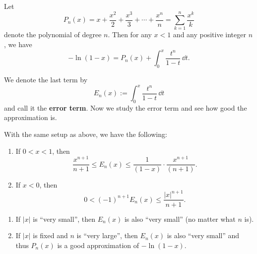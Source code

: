 \documentclass[a4paper]{ctexart}
\begin{document}
	\begin{mythm}
		Let
		\[
		P_n(x) = x + \frac{x^2}{2} + \frac{x^3}{3} + \cdots + \frac{x^n}{n} = \sum_{k=1}^n \frac{x^k}{k}
		\]
		denote the polynomial of degree $n$. Then for any $x<1$ and any positive integer $n$, we have
		\[
		-\ln(1-x) = P_n(x) + \int_0^x \frac{t^n}{1-t}\, \dd t.
		\]
	\end{mythm}
	\begin{myrmk}
		We denote the last term by
		\[
		E_n(x) := \int_0^x \frac{t^n}{1-t}\, \dd t
		\]
		and call it the \textbf{error term}. Now we study the error term and see how good the approximation is.
	\end{myrmk}
	\begin{mythm}
		With the same setup as above, we have the following:
		\begin{enumerate}
			\item [(1)] If $0<x<1$, then
			\[
			\frac{x^{n+1}}{n+1} \leq E_n(x) \leq \frac{1}{(1-x)}\cdot\frac{x^{n+1}}{(n+1)}.
			\]
			\item [(2)] If $x<0$, then
			\[
			0 < (-1)^{n+1} E_n(x) \leq \frac{|x|^{n+1}}{n+1}.
			\]
		\end{enumerate}
	\end{mythm}
	\begin{myrmk}
		\begin{enumerate}
			\item [(1)] If $|x|$ is ``very small'', then $E_n(x)$ is also ``very small'' (no matter what $n$ is).
			\item [(2)] If $|x|$ is fixed and $n$ is ``very large'', then $E_n(x)$ is also ``very small'' and thus $P_n(x)$ is a good approximation of $-\ln(1-x)$.
		\end{enumerate}
	\end{myrmk}
	
\end{document}
